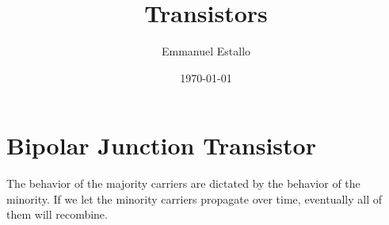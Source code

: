 \documentclass{article}
\title{Transistors}
\author{Emmanuel Estallo}
\date{\today}
\begin{document}
\boldmath 
\maketitle 

\section{Bipolar Junction Transistor}
\noindent 
The behavior of the majority carriers are dictated by the behavior of the minority.
If we let the minority carriers propagate over time, eventually all of them will 
recombine. 
\end{document}
